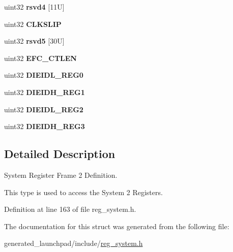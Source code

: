 \begin{DoxyCompactItemize}
\mbox{\label{structsystemBase2_a61dc29a9f9a37ca2cf37b3d8637b4ac8}} 
uint32 {\bfseries rsvd4} \mbox{[}11\+U\mbox{]}
\item 
\mbox{\label{structsystemBase2_ab56e0e53e78c61caf44452f0bef81eba}} 
uint32 {\bfseries C\+L\+K\+S\+L\+IP}
\item 
\mbox{\label{structsystemBase2_aeafe57e73df94bf8a6d4d1183e11ec50}} 
uint32 {\bfseries rsvd5} \mbox{[}30\+U\mbox{]}
\item 
\mbox{\label{structsystemBase2_a6236fe50a2bd44f8a15c340dc6ed6abf}} 
uint32 {\bfseries E\+F\+C\+\_\+\+C\+T\+L\+EN}
\item 
\mbox{\label{structsystemBase2_a6917e0d5c610ae68c9b8ebaebbd0a362}} 
uint32 {\bfseries D\+I\+E\+I\+D\+L\+\_\+\+R\+E\+G0}
\item 
\mbox{\label{structsystemBase2_aa27da01af099fda13ae4c97874458f95}} 
uint32 {\bfseries D\+I\+E\+I\+D\+H\+\_\+\+R\+E\+G1}
\item 
\mbox{\label{structsystemBase2_ace09ba1e51cfd3923695a1d4d091857e}} 
uint32 {\bfseries D\+I\+E\+I\+D\+L\+\_\+\+R\+E\+G2}
\item 
\mbox{\label{structsystemBase2_a4cc65202d2e97f166cb43237ac84b847}} 
uint32 {\bfseries D\+I\+E\+I\+D\+H\+\_\+\+R\+E\+G3}
\end{DoxyCompactItemize}


\subsection{Detailed Description}
System Register Frame 2 Definition. 

This type is used to access the System 2 Registers. 

Definition at line 163 of file reg\+\_\+system.\+h.



The documentation for this struct was generated from the following file\+:\begin{DoxyCompactItemize}
\item 
generated\+\_\+launchpad/include/\mbox{\hyperlink{reg__system_8h}{reg\+\_\+system.\+h}}\end{DoxyCompactItemize}
